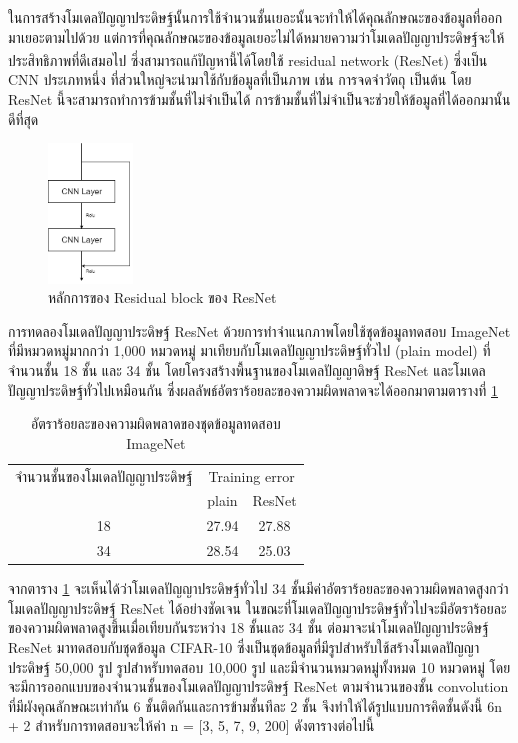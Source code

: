 ในการสร้างโมเดลปัญญาประดิษฐ์นั้นการใช้จำนวนชั้นเยอะนั้นจะทำให้ได้คุณลักษณะของข้อมูลที่ออกมาเยอะตามไปด้วย 
แต่การที่คุณลักษณะของข้อมูลเยอะไม่ได้หมายความว่าโมเดลปัญญาประดิษฐ์จะให้ประสิทธิภาพที่ดีเสมอไป ซึ่งสามารถแก้ปัญหานี้ได้โดยใช้ residual network (ResNet)\textsuperscript{\cite{he2016deep}} 
ซึ่งเป็น CNN ประเภทหนึ่ง ที่ส่วนใหญ่จะนำมาใช้กับข้อมูลที่เป็นภาพ เช่น การจดจำวัตถุ เป็นต้น โดย ResNet นี้จะสามารถทำการข้ามชั้นที่ไม่จำเป็นได้ 
การข้ามชั้นที่ไม่จำเป็นจะช่วยให้ข้อมูลที่ได้ออกมานั้นดีที่สุด

\begin{figure}[!ht]
	\centering
	\includegraphics[width=0.2\textwidth]{chapter2/images/example_resnet.png}
		\caption{หลักการของ Residual block ของ ResNet}
    	\label{fig:ResNet}
\end{figure}

การทดลองโมเดลปัญญาประดิษฐ์ ResNet ด้วยการทำจำแนกภาพโดยใช้ชุดข้อมูลทดสอบ ImageNet ที่มีหมวดหมู่มากกว่า 1,000 หมวดหมู่
มาเทียบกับโมเดลปัญญาประดิษฐ์ทั่วไป (plain model) ที่จำนวนชั้น 18 ชั้น และ 34 ชั้น โดยโครงสร้างพื้นฐานของโมเดลปัญญาดิษฐ์ ResNet และโมเดลปัญญาประดิษฐ์ทั่วไปเหมือนกัน 
ซึ่งผลลัพธ์อัตราร้อยละของความผิดพลาดจะได้ออกมาตามตารางที่ \ref{tab: Top-1 error of ImageNet} 

\begin{table}[!ht]
	\centering
	\begin{tabular}{|c|c|c|}
		\hline
		{จำนวนชั้นของโมเดลปัญญาประดิษฐ์}&\multicolumn{2}{c|}{Training error}\\
		\cline{2-3}
		{}							& plain						& ResNet			\\
		\hline
		18							& 27.94						& 27.88				\\
		34							& 28.54						& 25.03				\\
		\hline
	\end{tabular}
	\caption{อัตราร้อยละของความผิดพลาดของชุดข้อมูลทดสอบ ImageNet}
	\label{tab: Top-1 error of ImageNet}
\end{table}

จากตาราง \ref{tab: Top-1 error of ImageNet} จะเห็นได้ว่าโมเดลปัญญาประดิษฐ์ทั่วไป 34 ชั้นมีค่าอัตราร้อยละของความผิดพลาดสูงกว่าโมเดลปัญญาประดิษฐ์ ResNet 
ได้อย่างชัดเจน ในขณะที่โมเดลปัญญาประดิษฐ์ทั่วไปจะมีอัตราร้อยละของความผิดพลาดสูงขึ้นเมื่อเทียบกันระหว่าง 18 ชั้นและ 34 ชั้น
\clearpage
ต่อมาจะนำโมเดลปัญญาประดิษฐ์ ResNet มาทดสอบกับชุดข้อมูล CIFAR-10 ซึ่งเป็นชุดข้อมูลที่มีรูปสำหรับใช้สร้างโมเดลปัญญาประดิษฐ์ 50,000 รูป รูปสำหรับทดสอบ 10,000 รูป 
และมีจำนวนหมวดหมู่ทั้งหมด 10 หมวดหมู่ โดยจะมีการออกแบบของจำนวนชั้นของโมเดลปัญญาประดิษฐ์ ResNet ตามจำนวนของชั้น convolution 
ที่มีผังคุณลักษณะเท่ากัน 6 ชั้นติดกันและการข้ามชั้นทีละ 2 ชั้น จึงทำให้ได้รูปแบบการคิดชั้นดังนี้ 6n + 2 สำหรับการทดสอบจะให้ค่า n = [3, 5, 7, 9, 200] ดังตารางต่อไปนี้

